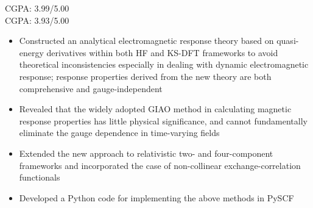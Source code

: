 \documentclass[10pt,a4paper]{altacv}
\begin{document}

\begin{fullwidth}
\makecvheader
\end{fullwidth}


\textsc{CGPA}: 3.99/5.00
\\
\textsc{CGPA}: 3.93/5.00


\begin{itemize}
\item Constructed an analytical electromagnetic response theory based on quasi-energy derivatives within both HF and KS-DFT frameworks to avoid theoretical inconsistencies especially in dealing with dynamic electromagnetic response; response properties derived from the new theory are both comprehensive and gauge-independent
\item Revealed that the widely adopted GIAO method in calculating magnetic response properties has little physical significance, and cannot fundamentally eliminate the gauge dependence in time-varying fields
\item Extended the new approach to relativistic two- and four-component frameworks and incorporated the case of non-collinear exchange-correlation functionals
\item Developed a Python code for implementing the above methods in PySCF
\end{itemize}
\end{document}
